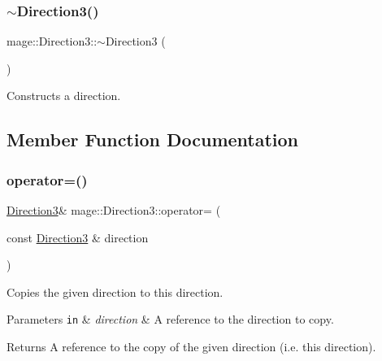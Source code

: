 \subsubsection{\texorpdfstring{$\sim$\+Direction3()}{~Direction3()}}
{\footnotesize\ttfamily mage\+::\+Direction3\+::$\sim$\+Direction3 (\begin{DoxyParamCaption}{ }\end{DoxyParamCaption})\hspace{0.3cm}{\ttfamily [default]}}

Constructs a direction. 

\subsection{Member Function Documentation}
\hypertarget{structmage_1_1_direction3_a474a3c1ecf07954ff598933cef4f85f4}{}\label{structmage_1_1_direction3_a474a3c1ecf07954ff598933cef4f85f4} 
\subsubsection{\texorpdfstring{operator=()}{operator=()}\hspace{0.1cm}{\footnotesize\ttfamily [1/2]}}
{\footnotesize\ttfamily \hyperlink{structmage_1_1_direction3}{Direction3}\& mage\+::\+Direction3\+::operator= (\begin{DoxyParamCaption}\item[{const \hyperlink{structmage_1_1_direction3}{Direction3} \&}]{direction }\end{DoxyParamCaption})\hspace{0.3cm}{\ttfamily [default]}}

Copies the given direction to this direction.


\begin{DoxyParams}[1]{Parameters}
\mbox{\tt in}  & {\em direction} & A reference to the direction to copy. \\
\hline
\end{DoxyParams}
\begin{DoxyReturn}{Returns}
A reference to the copy of the given direction (i.\+e. this direction). 
\end{DoxyReturn}
\hypertarget{structmage_1_1_direction3_aac5690f3f40ba12f4e9eb09f5d2fb7f7}{}\label{structmage_1_1_direction3_aac5690f3f40ba12f4e9eb09f5d2fb7f7} 
